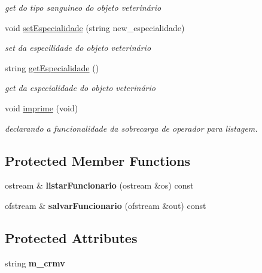 \begin{DoxyCompactItemize}
\begin{DoxyCompactList}\small\item\em get do tipo sanguineo do objeto veterinário \end{DoxyCompactList}\item 
void \mbox{\hyperlink{class_veterinario_a64032de74af72011133d94dea6a49514}{set\+Especialidade}} (string new\+\_\+especialidade)
\begin{DoxyCompactList}\small\item\em set da especilidade do objeto veterinário \end{DoxyCompactList}\item 
string \mbox{\hyperlink{class_veterinario_a5cc3a097b0235decb1409f67ba4973f8}{get\+Especialidade}} ()
\begin{DoxyCompactList}\small\item\em get da especialidade do objeto veterinário \end{DoxyCompactList}\item 
\mbox{\label{class_veterinario_a06f31108772b7f9ac6e19c42ec45bc82}} 
void \mbox{\hyperlink{class_veterinario_a06f31108772b7f9ac6e19c42ec45bc82}{imprime}} (void)
\begin{DoxyCompactList}\small\item\em declarando a funcionalidade da sobrecarga de operador para listagem. \end{DoxyCompactList}\end{DoxyCompactItemize}
\subsection*{Protected Member Functions}
\begin{DoxyCompactItemize}
\item 
\mbox{\label{class_veterinario_ad6d6c138556bfa95ebda924ad06939f4}} 
ostream \& {\bfseries listar\+Funcionario} (ostream \&os) const
\item 
\mbox{\label{class_veterinario_a2b5f45ca79235742a046137928f3f7f0}} 
ofstream \& {\bfseries salvar\+Funcionario} (ofstream \&out) const
\end{DoxyCompactItemize}
\subsection*{Protected Attributes}
\begin{DoxyCompactItemize}
\item 
\mbox{\label{class_veterinario_a26fb88e7b290d24b7eeb5013ddda636b}} 
string {\bfseries m\+\_\+crmv}
\end{DoxyCompactItemize}


